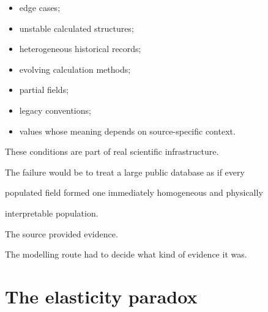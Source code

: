 \documentclass[11pt,a4paper,oneside]{report}
\begin{document}
\begin{itemize}



\item

edge cases;



\item

unstable calculated structures;



\item

heterogeneous historical records;



\item

evolving calculation methods;



\item

partial fields;



\item

legacy conventions;



\item

values whose meaning depends on source-specific context.



\end{itemize}



These conditions are part of real scientific infrastructure.



The failure would be to treat a large public database as if every

populated field formed one immediately homogeneous and physically

interpretable population.



The source provided evidence.



The modelling route had to decide what kind of evidence it was.





\section{The elasticity paradox}
\end{document}
